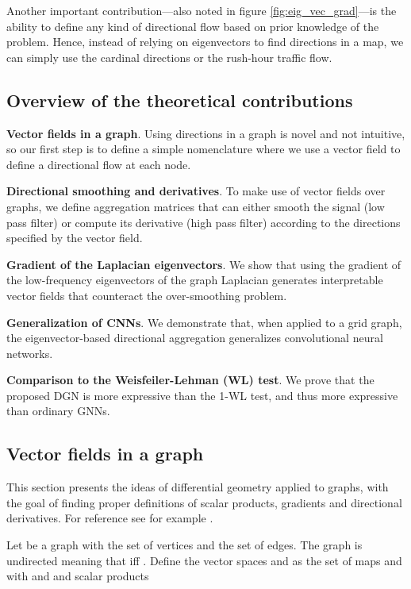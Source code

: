 \documentclass{article} \usepackage{arxiv,times}
\newcommand{\xhdr}[1]{{\noindent\bfseries #1}.}
\begin{document}
Another important contribution---also noted in figure \ref{fig:eig_vec_grad}---is the ability to define any kind of directional flow based on prior knowledge of the problem. Hence, instead of relying on eigenvectors to find directions in a map, we can simply use the cardinal directions or the rush-hour traffic flow.


\subsection{Overview of the theoretical contributions}

\xhdr{Vector fields in a graph}
Using directions in a graph is novel and not intuitive, so our first step is to define a simple nomenclature where we use a vector field to define a directional flow at each node.

\xhdr{Directional smoothing and derivatives}
To make use of vector fields over graphs, we define aggregation matrices that can either smooth the signal (low pass filter) or compute its derivative (high pass filter) according to the directions specified by the vector field.

\xhdr{Gradient of the Laplacian eigenvectors} We show that using the gradient of the low-frequency eigenvectors of the graph Laplacian generates interpretable vector fields that counteract the over-smoothing problem.

\xhdr{Generalization of CNNs} We demonstrate that, when applied to a grid graph, the eigenvector-based directional aggregation generalizes convolutional neural networks.

\xhdr{Comparison to the Weisfeiler-Lehman (WL) test} We prove that the proposed DGN is more expressive than the 1-WL test, and thus more expressive than ordinary GNNs.




\subsection{Vector fields in a graph}
This section presents the ideas of differential geometry applied to graphs, with the goal of finding proper definitions of scalar products, gradients and directional derivatives. For reference see for example \cite{bronstein_geometric_2017,Grebenkov_2013,discrete_calculus_2010}.



Let  be a graph with  the set of vertices and  the set of edges. The graph is undirected meaning that  iff . Define the vector spaces  and  as the set of maps  and  with  and  and scalar products
\end{document}
